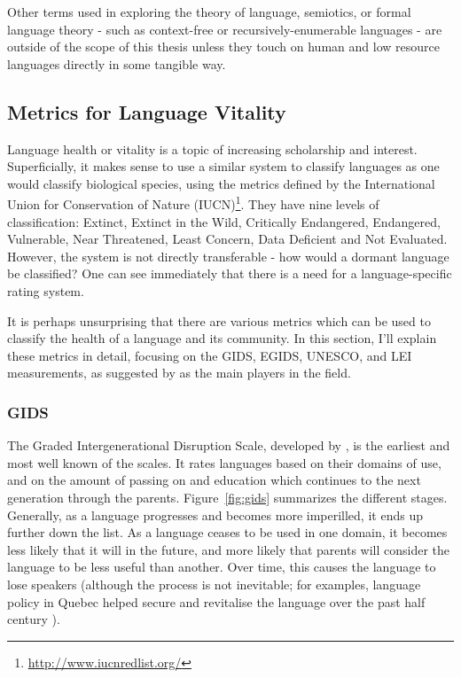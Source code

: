 Other terms used in exploring the theory of language, semiotics, or formal language theory - such as context-free or recursively-enumerable languages - are outside of the scope of this thesis unless they touch on human and low resource languages directly in some tangible way.

\subsection{Metrics for Language Vitality}
\label{subsec:metrics}

Language health or vitality is a topic of increasing scholarship and interest. Superficially, it makes sense to use a similar system to classify languages as one would classify biological species, using the metrics defined by the International Union for Conservation of Nature (IUCN)\footnote{\href{http://www.iucnredlist.org/}{http://www.iucnredlist.org/}}. They have nine levels of classification: Extinct, Extinct in the Wild, Critically Endangered, Endangered, Vulnerable, Near Threatened, Least Concern, Data Deficient and Not Evaluated. However, the system is not directly transferable - how would a dormant language be classified? One can see immediately that there is a need for a language-specific rating system.

It is perhaps unsurprising that there are various metrics which can be used to classify the health of a language and its community. In this section, I'll explain these metrics in detail, focusing on the GIDS, EGIDS, UNESCO, and LEI measurements, as suggested by \citet{yang2017toward} as the main players in the field.

\subsubsection{GIDS}

The Graded Intergenerational Disruption Scale, developed by \citet{fishman1991reversing}, is the earliest and most well known of the scales. It rates languages based on their domains of use, and on the amount of passing on and education which continues to the next generation through the parents. Figure~\ref{fig:gids} summarizes the different stages. Generally, as a language progresses and becomes more imperilled, it ends up further down the list. As a language ceases to be used in one domain, it becomes less likely that it will in the future, and more likely that parents will consider the language to be less useful than another. Over time, this causes the language to lose speakers (although the process is not inevitable; for examples, language policy in Quebec helped secure and revitalise the language over the past half century \citep{bourhis2001reversing}).

